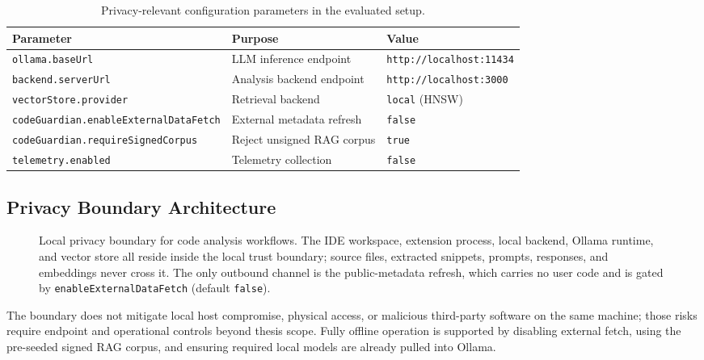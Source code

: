 \begin{table}[H]
  \centering
  \caption{Privacy-relevant configuration parameters in the evaluated setup.}
  \label{tab:privacy-config}
  \small
  \begin{tabularx}{\textwidth}{lXl}
    \toprule
    Parameter & Purpose & Value \\
    \midrule
    \texttt{ollama.baseUrl} & LLM inference endpoint & \texttt{http://localhost:11434} \\
    \texttt{backend.serverUrl} & Analysis backend endpoint & \texttt{http://localhost:3000} \\
    \texttt{vectorStore.provider} & Retrieval backend & \texttt{local} (HNSW) \\
    \texttt{codeGuardian.enableExternalDataFetch} & External metadata refresh & \texttt{false} \\
    \texttt{codeGuardian.requireSignedCorpus} & Reject unsigned RAG corpus & \texttt{true} \\
    \texttt{telemetry.enabled} & Telemetry collection & \texttt{false} \\
    \bottomrule
  \end{tabularx}
\end{table}

\subsection{Privacy Boundary Architecture}

\begin{figure}[H]
  \centering
  \caption[Local privacy boundary for code analysis workflows.]{Local privacy boundary for code analysis workflows. The IDE workspace, extension process, local backend, Ollama runtime, and vector store all reside inside the local trust boundary; source files, extracted snippets, prompts, responses, and embeddings never cross it. The only outbound channel is the public-metadata refresh, which carries no user code and is gated by \texttt{enableExternalDataFetch} (default \texttt{false}).}
  \label{fig:privacy-boundary}
\end{figure}

The boundary does not mitigate local host compromise, physical access, or malicious third-party software on the same machine; those risks require endpoint and operational controls beyond thesis scope. Fully offline operation is supported by disabling external fetch, using the pre-seeded signed RAG corpus, and ensuring required local models are already pulled into Ollama.
